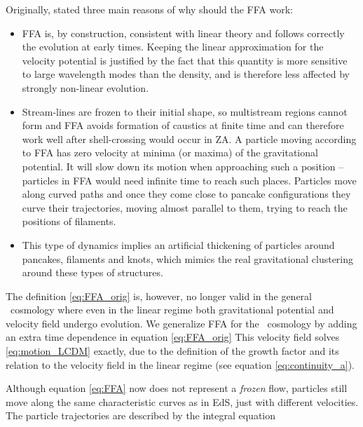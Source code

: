 Originally, \textcite{Matarrese:1992be} stated three main reasons of why should the FFA work:
\begin{itemize}
\item FFA is, by construction, consistent with linear theory and follows correctly the evolution at early times. Keeping the linear approximation for the velocity potential is justified by the fact that this quantity is more sensitive to large wavelength modes than the density, and is therefore less affected by strongly non-linear evolution.
\item Stream-lines are frozen to their initial shape, so multistream regions cannot form and FFA avoids formation of caustics at finite time and can therefore work well after shell-crossing would occur in ZA. A particle moving according to FFA has zero velocity at minima (or maxima) of the gravitational potential. It will slow down its motion when approaching such a position -- particles in FFA would need infinite time to reach such places. Particles move along curved paths and once they come close to pancake configurations they curve their trajectories, moving almost parallel to them, trying to reach the positions of filaments.
\item This type of dynamics implies an artificial thickening of particles around pancakes, filaments and knots, which mimics the real gravitational clustering around these types of structures.
\end{itemize}

The definition \eqref{eq:FFA_orig} is, however, no longer valid in the general \LCDM\ cosmology where even in the linear regime both gravitational potential and velocity field undergo evolution. We generalize FFA for the \LCDM\ cosmology by adding an extra time dependence in equation \eqref{eq:FFA_orig}
This velocity field solves \eqref{eq:motion_LCDM} exactly, due to the definition of the growth factor and its relation to the velocity field in the linear regime (see equation \eqref{eq:continuity_a}).

Although equation \eqref{eq:FFA} now does not represent a \textit{frozen} flow, particles still move along the same characteristic curves as in EdS, just with different velocities. The particle trajectories are described by the integral equation

